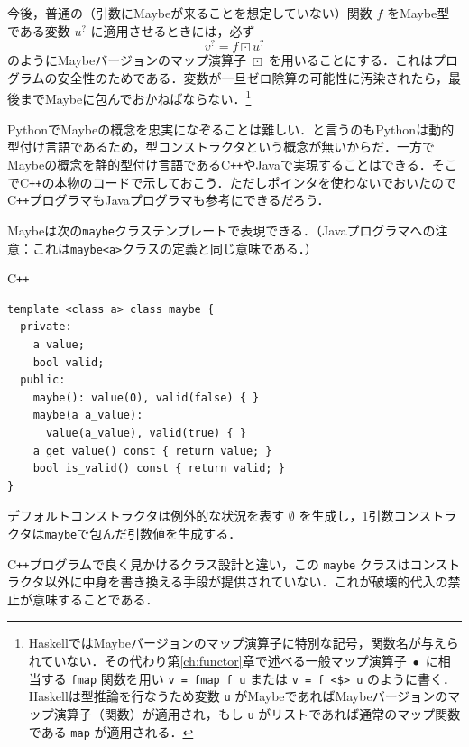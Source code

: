 \documentclass[a4paper,twocolumn]{jsbook}
\newcommand{\programminglanguage}[1]{\textsf{#1}}
\newcommand{\cxx}{\programminglanguage{C}\texttt{++}}
\newcommand{\haskell}{\programminglanguage{Haskell}}
\newcommand{\java}{\programminglanguage{Java}}
\newcommand{\python}{\programminglanguage{Python}}
\newcommand{\code}[1]{\texttt{#1}}
\newenvironment{cxxcode}{\begin{itembox}[r]{\cxx}}{\end{itembox}}
\newcommand{\mNothing}{\emptyset}
\DeclareMathOperator{\mMap}{\bullet}
\DeclareMathOperator{\mMapMaybe}{\boxdot}
\newcommand{\mMaybe}[1]{{#1}^?}
\begin{document}
今後，普通の（引数にMaybeが来ることを想定していない）関数 $f$ をMaybe型である変数 $\mMaybe{u}$ に適用させるときには，必ず
\begin{equation}
\mMaybe{v}=f\mMapMaybe\mMaybe{u}
\end{equation}
のようにMaybeバージョンのマップ演算子 $\mMapMaybe$ を用いることにする．これはプログラムの安全性のためである．変数が一旦ゼロ除算の可能性に汚染されたら，最後までMaybeに包んでおかねばならない．\footnote{\haskell ではMaybeバージョンのマップ演算子に特別な記号，関数名が与えられていない．その代わり第\ref{ch:functor}章で述べる一般マップ演算子 $\mMap$ に相当する \code{fmap} 関数を用い \code{v = fmap f u} または \code{v = f <\$> u} のように書く．\haskell は型推論を行なうため変数 \code{u} がMaybeであればMaybeバージョンのマップ演算子（関数）が適用され，もし \code{u} がリストであれば通常のマップ関数である \code{map} が適用される．}

\python でMaybeの概念を忠実になぞることは難しい．と言うのも\python は動的型付け言語であるため，型コンストラクタという概念が無いからだ．一方でMaybeの概念を静的型付け言語である\cxx や\java で実現することはできる．そこで\cxx の本物のコードで示しておこう．ただしポインタを使わないでおいたので\cxx プログラマも\java プログラマも参考にできるだろう．

Maybeは次の\code{maybe}クラステンプレートで表現できる．（\java プログラマへの注意：これは\code{maybe<a>}クラスの定義と同じ意味である．）
\begin{cxxcode}
\begin{verbatim}
template <class a> class maybe {
  private:
    a value;
    bool valid;
  public:
    maybe(): value(0), valid(false) { }
    maybe(a a_value):
      value(a_value), valid(true) { }
    a get_value() const { return value; }
    bool is_valid() const { return valid; }
}
\end{verbatim}
\end{cxxcode}
デフォルトコンストラクタは例外的な状況を表す $\mNothing$ を生成し，1引数コンストラクタは\code{maybe}で包んだ引数値を生成する．

\cxx プログラムで良く見かけるクラス設計と違い，この \code{maybe} クラスはコンストラクタ以外に中身を書き換える手段が提供されていない．これが破壊的代入の禁止が意味することである．
\end{document}
